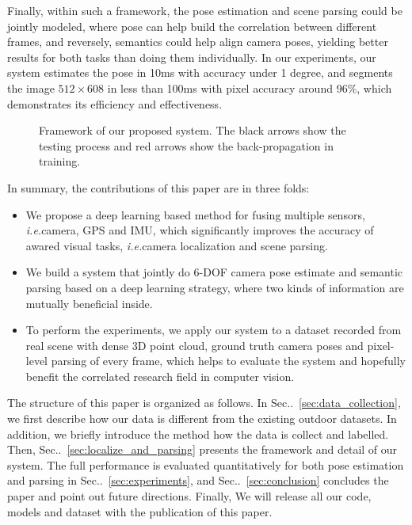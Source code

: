 \documentclass[10pt,twocolumn,letterpaper]{article}
\makeatletter
\newcommand{\secref}[1]{Sec\onedot~\ref{#1}}
\DeclareRobustCommand\onedot{\futurelet\@let@token\@onedot}
\def\onedot{\ifx\@let@token.\else.\null\fi\xspace}
\def\ie{\emph{i.e.}}
\makeatother
\begin{document}
Finally, within such a framework, the pose estimation and scene parsing could be jointly modeled, where pose can help build the correlation between different frames, and reversely, semantics could help align camera poses, yielding better results for both tasks than doing them individually. In our experiments, our system estimates the pose in 10ms with accuracy under 1 degree, and segments the image $512 \times 608$ in less than 100ms with pixel accuracy around 96$\%$, which demonstrates its efficiency and effectiveness.

\begin{figure*}[t]
\fbox{\rule{0pt}{2in} \rule{.9\linewidth}{0pt}}
   \caption{Framework of our proposed system. The black arrows show the testing process and red arrows show the back-propagation in training.}
\label{fig:framework}
\end{figure*}

In summary, the contributions of this paper are in three folds:
\begin{itemize}
    \item We propose a deep learning based method for fusing multiple sensors, \ie camera, GPS and IMU, which significantly improves the accuracy of awared visual tasks, \ie camera localization and scene parsing.
    \item We build a system that jointly do 6-DOF camera pose estimate and semantic parsing based on a deep learning strategy, where two kinds of information are mutually beneficial inside.
    \item To perform the experiments, we apply our system to a dataset recorded from real scene with dense 3D point cloud, ground truth camera poses and pixel-level parsing of every frame, which helps to evaluate the system and hopefully benefit the correlated research field in computer vision.
\end{itemize}

The structure of this paper is organized as follows. In \secref{sec:data_collection}, we first describe how our data is different from the existing outdoor datasets. In addition, we briefly introduce the method how the data is collect and labelled. Then, \secref{sec:localize_and_parsing} presents the framework and detail of our system. The full performance is evaluated quantitatively for both pose estimation and parsing in \secref{sec:experiments}, and \secref{sec:conclusion} concludes the paper and point out future directions. Finally, We will release all our code, models and dataset with the publication of this paper.
\end{document}
